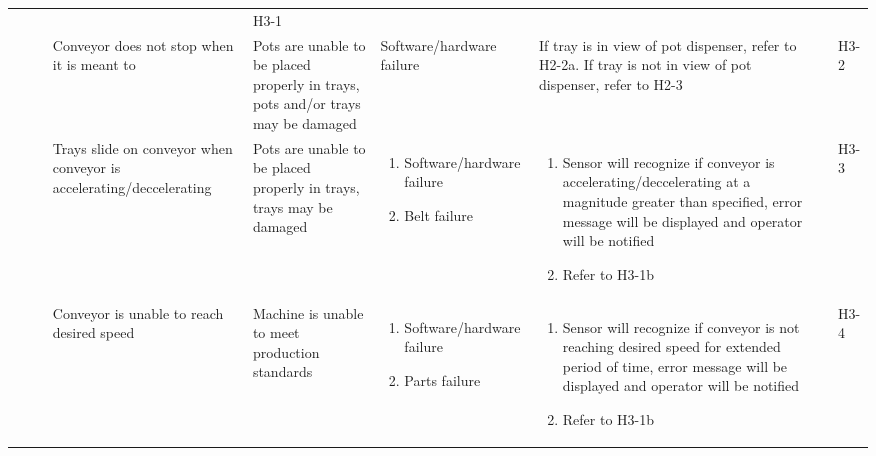 \documentclass{article}
\begin{document}
\begin{landscape}
\begin{center}
\begin{longtable}{|l|  p{3cm}  p{4cm}  p{4cm}  p{4cm}  p{1cm}  p{1cm}|}
\begin{enumerate}[label=(\alph*)]
        \end{enumerate}&
        &
        H3-1\\
        &
        Conveyor does not stop when it is meant to&
        Pots are unable to be placed properly in trays, pots and/or trays may be damaged&
        Software/hardware failure&
        If tray is in view of pot dispenser, refer to H2-2a. If tray is not in view of pot dispenser, refer to H2-3&
        &
        H3-2\\
        &
        Trays slide on conveyor when conveyor is accelerating/deccelerating&
        Pots are unable to be placed properly in trays, trays may be damaged&
        \begin{enumerate}[label=(\alph*)]
            \item Software/hardware failure
            \item Belt failure
        \end{enumerate}&
        \begin{enumerate}[label=(\alph*)]
            \item Sensor will recognize if conveyor is accelerating/deccelerating at a magnitude greater than specified, error message will be displayed and operator will be notified
            \item Refer to H3-1b
        \end{enumerate}&
        &
        H3-3\\

        &
        Conveyor is unable to reach desired speed&
        Machine is unable to meet production standards&
        \begin{enumerate}[label=(\alph*)]
            \item Software/hardware failure
            \item Parts failure
        \end{enumerate}&
        \begin{enumerate}[label=(\alph*)]
            \item  Sensor will recognize if conveyor is not reaching desired speed for extended period of time, error message will be displayed and operator will be notified
            \item Refer to H3-1b
        \end{enumerate}&
        &
        H3-4\\



    \cline{2-7}
    \hline

    \end{longtable}
\end{center}
\end{landscape}
\end{document}
